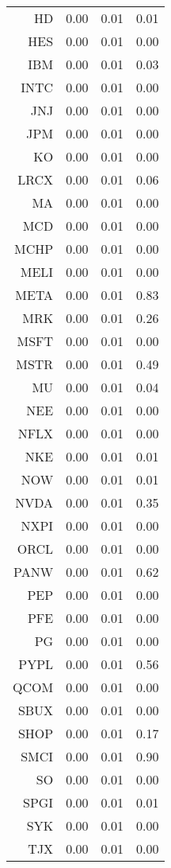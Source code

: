 \begin{table}[ht]
\begin{tabular}{rrrr}
  HD & 0.00 & 0.01 & 0.01 \\ 
  HES & 0.00 & 0.01 & 0.00 \\ 
  IBM & 0.00 & 0.01 & 0.03 \\ 
  INTC & 0.00 & 0.01 & 0.00 \\ 
  JNJ & 0.00 & 0.01 & 0.00 \\ 
  JPM & 0.00 & 0.01 & 0.00 \\ 
  KO & 0.00 & 0.01 & 0.00 \\ 
  LRCX & 0.00 & 0.01 & 0.06 \\ 
  MA & 0.00 & 0.01 & 0.00 \\ 
  MCD & 0.00 & 0.01 & 0.00 \\ 
  MCHP & 0.00 & 0.01 & 0.00 \\ 
  MELI & 0.00 & 0.01 & 0.00 \\ 
  META & 0.00 & 0.01 & 0.83 \\ 
  MRK & 0.00 & 0.01 & 0.26 \\ 
  MSFT & 0.00 & 0.01 & 0.00 \\ 
  MSTR & 0.00 & 0.01 & 0.49 \\ 
  MU & 0.00 & 0.01 & 0.04 \\ 
  NEE & 0.00 & 0.01 & 0.00 \\ 
  NFLX & 0.00 & 0.01 & 0.00 \\ 
  NKE & 0.00 & 0.01 & 0.01 \\ 
  NOW & 0.00 & 0.01 & 0.01 \\ 
  NVDA & 0.00 & 0.01 & 0.35 \\ 
  NXPI & 0.00 & 0.01 & 0.00 \\ 
  ORCL & 0.00 & 0.01 & 0.00 \\ 
  PANW & 0.00 & 0.01 & 0.62 \\ 
  PEP & 0.00 & 0.01 & 0.00 \\ 
  PFE & 0.00 & 0.01 & 0.00 \\ 
  PG & 0.00 & 0.01 & 0.00 \\ 
  PYPL & 0.00 & 0.01 & 0.56 \\ 
  QCOM & 0.00 & 0.01 & 0.00 \\ 
  SBUX & 0.00 & 0.01 & 0.00 \\ 
  SHOP & 0.00 & 0.01 & 0.17 \\ 
  SMCI & 0.00 & 0.01 & 0.90 \\ 
  SO & 0.00 & 0.01 & 0.00 \\ 
  SPGI & 0.00 & 0.01 & 0.01 \\ 
  SYK & 0.00 & 0.01 & 0.00 \\ 
  TJX & 0.00 & 0.01 & 0.00 \\ 

\end{tabular}
\end{table}
